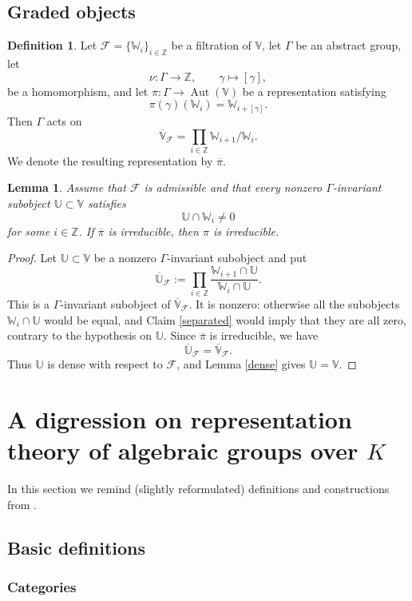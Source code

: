 \documentclass[11pt,a4paper,twoside]{amsart}
\newtheorem{lemma}[theorem]{Lemma}
\theoremstyle{definition}
\newtheorem{definition}[theorem]{Definition}
\theoremstyle{remark}
\newcommand{\mU}{\mathbb U}
\newcommand{\mV}{\mathbb V}
\newcommand{\mW}{\mathbb W}
\newcommand{\Gg}{\gamma}
\newcommand{\GG}{\Gamma}
\newcommand{\mcF}{\mathcal F}
\newcommand{\ZZ}{\mathbb Z}
\newcommand{\sms}{\smallskip}
\begin{document}
\subsection{Graded objects}
\begin{definition}
Let $\mcF=\{\mW_i\}_{i\in\ZZ}$ be a filtration of $\mV$, let $\GG$ be an abstract group, let
$$
\nu:\GG\to\ZZ,\qquad \Gg\mapsto[\Gg],
$$
be a homomorphism, and let $\pi:\GG\to\operatorname{Aut}(\mV)$ be a representation satisfying
$$
\pi(\Gg)(\mW_i)=\mW_{i+[\Gg]}.
$$
Then $\GG$ acts on
$$
\overline{\mV}_{\mcF}=\prod_{i\in\ZZ}\mW_{i+1}/\mW_i.
$$
We denote the resulting representation by $\overline\pi$.
\end{definition}
\begin{lemma}\label{bar}
Assume that $\mcF$ is admissible and that every nonzero $\GG$-invariant subobject $\mU\subset\mV$ satisfies
$$
\mU\cap\mW_i\neq0
$$
for some $i\in\ZZ$. If $\overline\pi$ is irreducible, then $\pi$ is irreducible.
\end{lemma}
\begin{proof}
Let $\mU\subset\mV$ be a nonzero $\GG$-invariant subobject and put
$$
\overline{\mU}_{\mcF}:=\prod_{i\in\ZZ}\frac{\mW_{i+1}\cap\mU}{\mW_i\cap\mU}.
$$
This is a $\GG$-invariant subobject of $\overline{\mV}_{\mcF}$. It is nonzero: otherwise all the subobjects $\mW_i\cap\mU$ would be equal, and Claim \ref{separated} would imply that they are all zero, contrary to the hypothesis on $\mU$. Since $\overline\pi$ is irreducible, we have
$$
\overline{\mU}_{\mcF}=\overline{\mV}_{\mcF}.
$$
Thus $\mU$ is dense with respect to $\mcF$, and Lemma \ref{dense} gives $\mU=\mV$.
\end{proof}

\sms

\section{A digression on representation theory of algebraic groups over $K$}\label{pro-vect} In this section we remind (slightly reformulated) definitions and constructions from \cite{GK}.
\subsection{Basic definitions}

\subsubsection{Categories}
\end{document}
